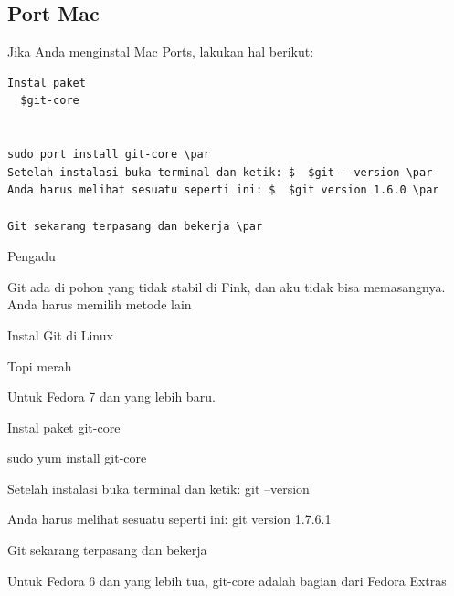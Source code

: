 \subsection{Port Mac}
\vspace{12pt}
\noindent 
Jika Anda menginstal Mac Ports, lakukan hal berikut: \par
\vspace{12pt}
\noindent
\begin{verbatim}
Instal paket
  $git-core
 

sudo port install git-core \par
Setelah instalasi buka terminal dan ketik: $  $git --version \par
Anda harus melihat sesuatu seperti ini: $  $git version 1.6.0 \par
 
Git sekarang terpasang dan bekerja \par

\end{verbatim} 
\noindent 
 $  $Pengadu \par
\vspace{12pt}
\noindent 
Git ada di pohon yang tidak stabil di Fink, dan aku tidak bisa memasangnya. $  $Anda harus memilih metode lain \par
\vspace{12pt}
\noindent 
 $  $Instal Git di Linux \par
\vspace{12pt}
\noindent 
 $  $Topi merah \par
\vspace{12pt}
\noindent 
Untuk Fedora 7 dan yang lebih baru. \par
\vspace{12pt}
\noindent 
Instal paket $  $git-core \par
\noindent 
sudo yum install git-core \par
\vspace{12pt}
\noindent 
Setelah instalasi buka terminal dan ketik: $  $git --version \par
\noindent 
Anda harus melihat sesuatu seperti ini: $  $git version 1.7.6.1 \par
\vspace{12pt}
\noindent 
Git sekarang terpasang dan bekerja \par
\vspace{12pt}
\noindent 
Untuk Fedora 6 dan yang lebih tua, git-core adalah bagian dari Fedora Extras  \par
\vspace{12pt}
